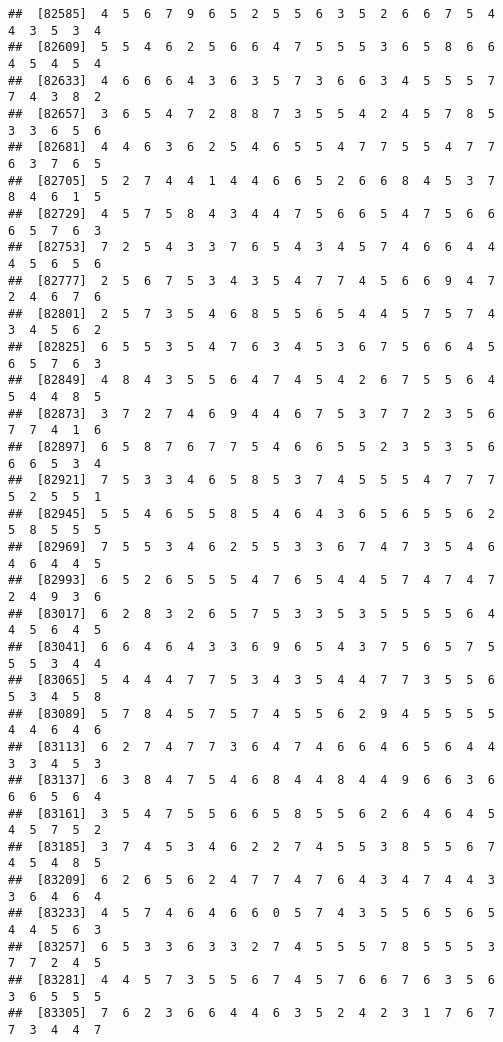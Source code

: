 \documentclass[
]{book}
\begin{document}
\begin{verbatim}
##  [82585]  4  5  6  7  9  6  5  2  5  5  6  3  5  2  6  6  7  5  4  4  3  5  3  4
##  [82609]  5  5  4  6  2  5  6  6  4  7  5  5  5  3  6  5  8  6  6  4  5  4  5  4
##  [82633]  4  6  6  6  4  3  6  3  5  7  3  6  6  3  4  5  5  5  7  7  4  3  8  2
##  [82657]  3  6  5  4  7  2  8  8  7  3  5  5  4  2  4  5  7  8  5  3  3  6  5  6
##  [82681]  4  4  6  3  6  2  5  4  6  5  5  4  7  7  5  5  4  7  7  6  3  7  6  5
##  [82705]  5  2  7  4  4  1  4  4  6  6  5  2  6  6  8  4  5  3  7  8  4  6  1  5
##  [82729]  4  5  7  5  8  4  3  4  4  7  5  6  6  5  4  7  5  6  6  6  5  7  6  3
##  [82753]  7  2  5  4  3  3  7  6  5  4  3  4  5  7  4  6  6  4  4  4  5  6  5  6
##  [82777]  2  5  6  7  5  3  4  3  5  4  7  7  4  5  6  6  9  4  7  2  4  6  7  6
##  [82801]  2  5  7  3  5  4  6  8  5  5  6  5  4  4  5  7  5  7  4  3  4  5  6  2
##  [82825]  6  5  5  3  5  4  7  6  3  4  5  3  6  7  5  6  6  4  5  6  5  7  6  3
##  [82849]  4  8  4  3  5  5  6  4  7  4  5  4  2  6  7  5  5  6  4  5  4  4  8  5
##  [82873]  3  7  2  7  4  6  9  4  4  6  7  5  3  7  7  2  3  5  6  7  7  4  1  6
##  [82897]  6  5  8  7  6  7  7  5  4  6  6  5  5  2  3  5  3  5  6  6  6  5  3  4
##  [82921]  7  5  3  3  4  6  5  8  5  3  7  4  5  5  5  4  7  7  7  5  2  5  5  1
##  [82945]  5  5  4  6  5  5  8  5  4  6  4  3  6  5  6  5  5  6  2  5  8  5  5  5
##  [82969]  7  5  5  3  4  6  2  5  5  3  3  6  7  4  7  3  5  4  6  4  6  4  4  5
##  [82993]  6  5  2  6  5  5  5  4  7  6  5  4  4  5  7  4  7  4  7  2  4  9  3  6
##  [83017]  6  2  8  3  2  6  5  7  5  3  3  5  3  5  5  5  5  6  4  4  5  6  4  5
##  [83041]  6  6  4  6  4  3  3  6  9  6  5  4  3  7  5  6  5  7  5  5  5  3  4  4
##  [83065]  5  4  4  4  7  7  5  3  4  3  5  4  4  7  7  3  5  5  6  5  3  4  5  8
##  [83089]  5  7  8  4  5  7  5  7  4  5  5  6  2  9  4  5  5  5  5  4  4  6  4  6
##  [83113]  6  2  7  4  7  7  3  6  4  7  4  6  6  4  6  5  6  4  4  3  3  4  5  3
##  [83137]  6  3  8  4  7  5  4  6  8  4  4  8  4  4  9  6  6  3  6  6  6  5  6  4
##  [83161]  3  5  4  7  5  5  6  6  5  8  5  5  6  2  6  4  6  4  5  4  5  7  5  2
##  [83185]  3  7  4  5  3  4  6  2  2  7  4  5  5  3  8  5  5  6  7  4  5  4  8  5
##  [83209]  6  2  6  5  6  2  4  7  7  4  7  6  4  3  4  7  4  4  3  3  6  4  6  4
##  [83233]  4  5  7  4  6  4  6  6  0  5  7  4  3  5  5  6  5  6  5  4  4  5  6  3
##  [83257]  6  5  3  3  6  3  3  2  7  4  5  5  5  7  8  5  5  5  3  7  7  2  4  5
##  [83281]  4  4  5  7  3  5  5  6  7  4  5  7  6  6  7  6  3  5  6  3  6  5  5  5
##  [83305]  7  6  2  3  6  6  4  4  6  3  5  2  4  2  3  1  7  6  7  7  3  4  4  7

\end{verbatim}
\end{document}
